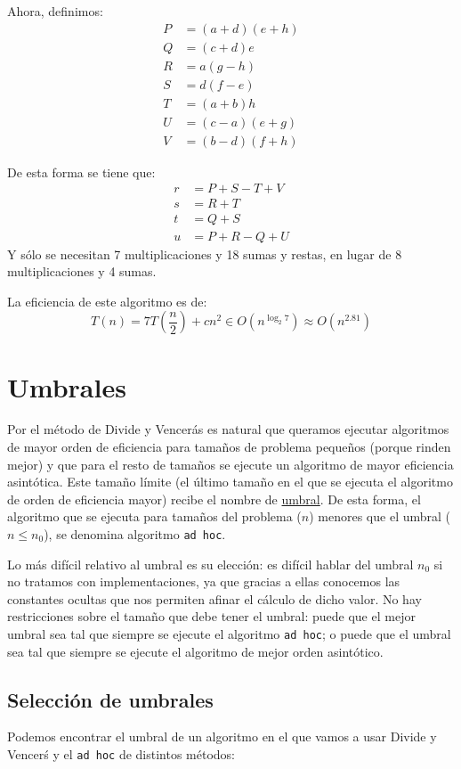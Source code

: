 Ahora, definimos:
\begin{align*}
    P &= (a+d)(e+h) \\
    Q &= (c+d)e \\
    R &= a(g-h) \\
    S &= d(f-e) \\
    T &= (a+b)h \\
    U &= (c-a)(e+g) \\
    V &= (b-d)(f+h)
\end{align*}

De esta forma se tiene que:
\begin{align*}
    r &= P + S - T + V \\
    s &= R + T \\
    t &= Q + S \\
    u &= P + R - Q + U
\end{align*}
Y sólo se necesitan 7 multiplicaciones y 18 sumas y restas, en lugar de 8 multiplicaciones y 4 sumas.

La eficiencia de este algoritmo es de:
\begin{equation*}
    T(n) = 7T\left(\dfrac{n}{2}\right) + cn^2 \in O\left(n^{\log_2 7}\right) \approx O(n^{2.81})
\end{equation*}

\section{Umbrales}
Por el método de Divide y Vencerás es natural que queramos ejecutar algoritmos de mayor orden de eficiencia para tamaños de problema pequeños (porque rinden mejor) y que para el resto de tamaños se ejecute un algoritmo de mayor eficiencia asintótica. Este tamaño límite (el último tamaño en el que se ejecuta el algoritmo de orden de eficiencia mayor) recibe el nombre de \ul{umbral}. De esta forma, el algoritmo que se ejecuta para tamaños del problema ($n$) menores que el umbral ($n \leq n_0$), se denomina algoritmo \verb|ad hoc|.

Lo más difícil relativo al umbral es su elección: es difícil hablar del umbral $n_0$ si no tratamos con implementaciones, ya que gracias a ellas conocemos las constantes ocultas que nos permiten afinar el cálculo de dicho valor. No hay restricciones sobre el tamaño que debe tener el umbral: puede que el mejor umbral sea tal que siempre se ejecute el algoritmo \verb|ad hoc|; o puede que el umbral sea tal que siempre se ejecute el algoritmo de mejor orden asintótico. 

\subsection{Selección de umbrales}
Podemos encontrar el umbral de un algoritmo en el que vamos a usar Divide y Vencerś y el \verb|ad hoc| de distintos métodos:


